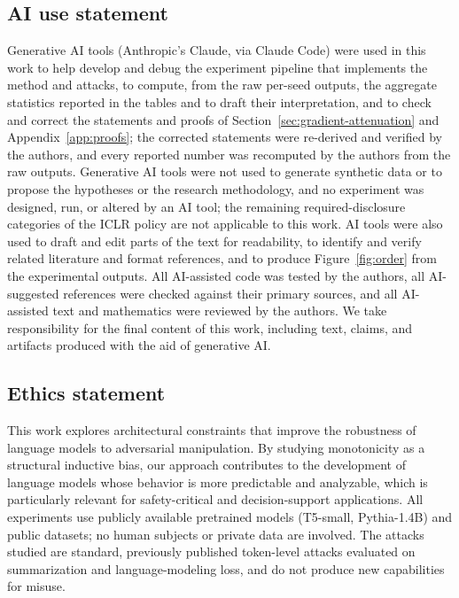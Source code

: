 \documentclass{article}
\theoremstyle{plain}
\theoremstyle{definition}
\theoremstyle{remark}
\theoremstyle{plain}
\begin{document}
\subsection*{AI use statement}
Generative AI tools (Anthropic's Claude, via Claude Code) were used in this work to help develop and debug the experiment pipeline that implements the method and attacks, to compute, from the raw per-seed outputs, the aggregate statistics reported in the tables and to draft their interpretation, and to check and correct the statements and proofs of Section~\ref{sec:gradient-attenuation} and Appendix~\ref{app:proofs}; the corrected statements were re-derived and verified by the authors, and every reported number was recomputed by the authors from the raw outputs. Generative AI tools were not used to generate synthetic data or to propose the hypotheses or the research methodology, and no experiment was designed, run, or altered by an AI tool; the remaining required-disclosure categories of the ICLR policy are not applicable to this work. AI tools were also used to draft and edit parts of the text for readability, to identify and verify related literature and format references, and to produce Figure~\ref{fig:order} from the experimental outputs. All AI-assisted code was tested by the authors, all AI-suggested references were checked against their primary sources, and all AI-assisted text and mathematics were reviewed by the authors. We take responsibility for the final content of this work, including text, claims, and artifacts produced with the aid of generative AI.

\subsection*{Ethics statement}
This work explores architectural constraints that improve the robustness of language models to adversarial manipulation. By studying monotonicity as a structural inductive bias, our approach contributes to the development of language models whose behavior is more predictable and analyzable, which is particularly relevant for safety-critical and decision-support applications. All experiments use publicly available pretrained models (T5-small, Pythia-1.4B) and public datasets; no human subjects or private data are involved. The attacks studied are standard, previously published token-level attacks evaluated on summarization and language-modeling loss, and do not produce new capabilities for misuse.
\end{document}

